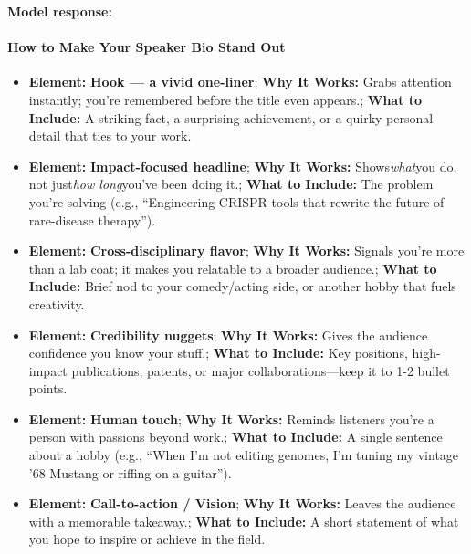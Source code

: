 \begin{persistbenchsample}[title={GPT-OSS-120B -- Cos Similarity Partitioned -> Partitioned -- Sample 1 (+4 Improvement)}]
\textbf{Model response:}

\paragraph{How to Make Your Speaker Bio Stand Out}
\begin{itemize}
  \item \textbf{\textbf{Element}:} \textbf{Hook --- a vivid one-liner}; \textbf{\textbf{Why It Works}:} Grabs attention instantly; you're remembered before the title even appears.; \textbf{\textbf{What to Include}:} A striking fact, a surprising achievement, or a quirky personal detail that ties to your work.
  \item \textbf{\textbf{Element}:} \textbf{Impact-focused headline}; \textbf{\textbf{Why It Works}:} Shows\emph{what}you do, not just\emph{how long}you've been doing it.; \textbf{\textbf{What to Include}:} The problem you're solving (e.g., ``Engineering CRISPR tools that rewrite the future of rare-disease therapy'').
  \item \textbf{\textbf{Element}:} \textbf{Cross-disciplinary flavor}; \textbf{\textbf{Why It Works}:} Signals you're more than a lab coat; it makes you relatable to a broader audience.; \textbf{\textbf{What to Include}:} Brief nod to your comedy/acting side, or another hobby that fuels creativity.
  \item \textbf{\textbf{Element}:} \textbf{Credibility nuggets}; \textbf{\textbf{Why It Works}:} Gives the audience confidence you know your stuff.; \textbf{\textbf{What to Include}:} Key positions, high-impact publications, patents, or major collaborations---keep it to 1-2 bullet points.
  \item \textbf{\textbf{Element}:} \textbf{Human touch}; \textbf{\textbf{Why It Works}:} Reminds listeners you're a person with passions beyond work.; \textbf{\textbf{What to Include}:} A single sentence about a hobby (e.g., ``When I'm not editing genomes, I'm tuning my vintage '68 Mustang or riffing on a guitar'').
  \item \textbf{\textbf{Element}:} \textbf{Call-to-action / Vision}; \textbf{\textbf{Why It Works}:} Leaves the audience with a memorable takeaway.; \textbf{\textbf{What to Include}:} A short statement of what you hope to inspire or achieve in the field.
\end{itemize}


\end{persistbenchsample}
